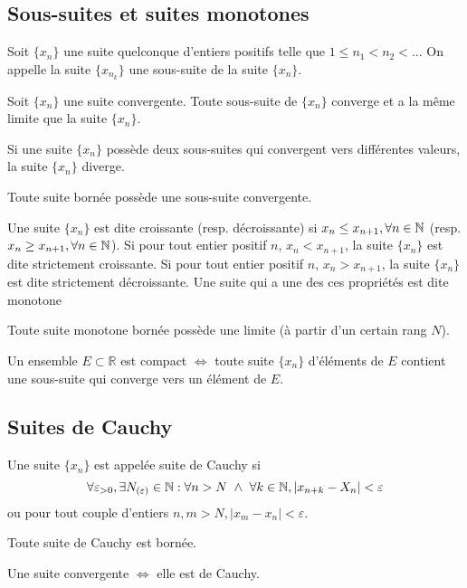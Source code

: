 	\subsection{Sous-suites et suites monotones}
	\begin{mydef}
		Soit $\{x_n\}$ une suite quelconque d'entiers positifs telle que $1\leq n_1<n_2<...$ On appelle la suite $\{x_{n_k}\}$ une sous-suite de la suite $\{x_n\}$.
	\end{mydef}
	\begin{mythm}
		Soit $\{x_n\}$ une suite convergente. Toute sous-suite de $\{x_n\}$ converge et a la même limite que la suite $\{x_n\}$.
	\end{mythm}
	\begin{mythm}[Corollaire]
		Si une suite $\{x_n\}$ possède deux sous-suites qui convergent vers différentes valeurs, la suite $\{x_n\}$ diverge.
	\end{mythm}
	\begin{mythm}
		Toute suite bornée possède une sous-suite convergente.
	\end{mythm}
	\begin{mydef}
		Une suite $\{x_n\}$ est dite croissante (resp. décroissante) si $x_n\leq x_{n+1}, \forall n\in\mathbb{N}$ (resp. $x_n\geq x_{n+1},\forall n \in\mathbb{N}$). Si pour tout entier positif $n$, $x_n<x_{n+1}$, la suite $\{x_n\}$ est dite strictement croissante. Si pour tout entier positif $n$, $x_n>x_{n+1}$, la suite $\{x_n\}$ est dite strictement décroissante. Une suite qui a une des ces propriétés est dite monotone
	\end{mydef}
	\begin{mythm}
		Toute suite monotone bornée possède une limite (à partir d'un certain rang $N$).
	\end{mythm}
	\begin{mythm}
		Un ensemble $E\subset\mathbb{R}$ est compact $\Longleftrightarrow$ toute suite $\{x_n\}$ d'éléments de $E$ contient une sous-suite qui converge vers un élément de $E$.
	\end{mythm}
	\subsection{Suites de Cauchy}
	\begin{mydef}
		Une suite $\{x_n\}$ est appelée suite de Cauchy si \[\forall\varepsilon_{>0},\exists N_{(\varepsilon)}\in\mathbb{N} : \forall n>N~\wedge~\forall k\in\mathbb{N}, |x_{n+k}-X_n|<\varepsilon\]
		ou pour tout couple d'entiers $n,m>N, |x_m-x_n|<\varepsilon$.
	\end{mydef}
	\begin{mythm}
		Toute suite de Cauchy est bornée.
	\end{mythm}
	\begin{mythm}
		Une suite convergente $\Longleftrightarrow$ elle est de Cauchy.
	\end{mythm}
